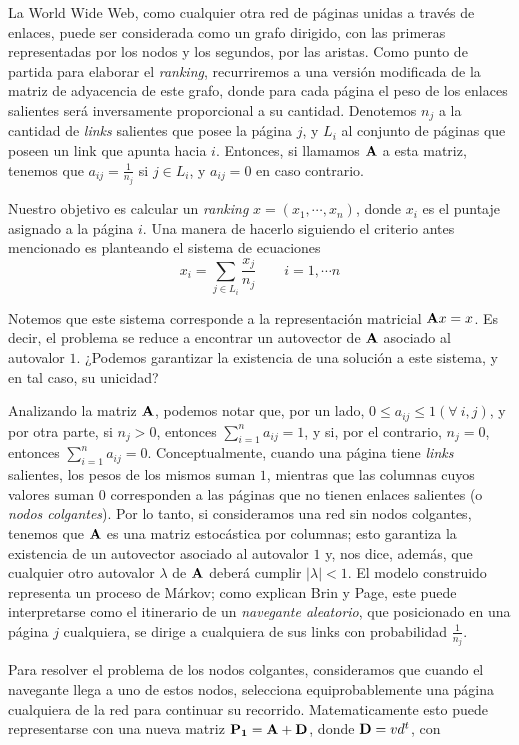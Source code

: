         La World Wide Web, como cualquier otra red de páginas unidas a través de enlaces, puede ser considerada como un grafo dirigido, con las primeras representadas por los nodos y los segundos, por las aristas. Como punto de partida para elaborar el \emph{ranking}, recurriremos a una versión modificada de la matriz de adyacencia de este grafo, donde para cada página el peso de los enlaces salientes será inversamente proporcional a su cantidad. Denotemos $n_{j}$ a la cantidad de \emph{links} salientes que posee la página $j$, y $L_i$ al conjunto de páginas que poseen un link que apunta hacia $i$. Entonces, si llamamos $\mathbf{A}$ a esta matriz, tenemos que $a_{ij} = \frac{1}{n_{j}}$ si $j \in L_i$, y $a_{ij} = 0$ en caso contrario.

        Nuestro objetivo es calcular un \emph{ranking} $x = (x_1, \cdots, x_n)$, donde $x_i$ es el puntaje asignado a la página $i$. Una manera de hacerlo siguiendo el criterio antes mencionado es planteando el sistema de ecuaciones
        \[ x_i = \sum_{j \in L_i} \frac{x_j}{n_j} \qquad i = 1, \cdots n \]

        Notemos que este sistema corresponde a la representación matricial $\mathbf{A}x = x$. Es decir, el problema se reduce a encontrar un autovector de $\mathbf{A}$ asociado al autovalor $1$. ¿Podemos garantizar la existencia de una solución a este sistema, y en tal caso, su unicidad?

        Analizando la matriz $\mathbf{A}$, podemos notar que, por un lado, $0 \leq a_{ij} \leq 1 (\forall\ i, j)$, y por otra parte, si $n_j > 0$, entonces $\sum_{i=1}^{n} a_{ij} = 1$, y si, por el contrario, $n_j = 0$, entonces $\sum_{i=1}^{n} a_{ij} = 0$. Conceptualmente, cuando una página tiene \emph{links} salientes, los pesos de los mismos suman $1$, mientras que las columnas cuyos valores suman $0$ corresponden a las páginas que no tienen enlaces salientes (o \emph{nodos colgantes}). Por lo tanto, si consideramos una red sin nodos colgantes, tenemos que $\mathbf{A}$ es una matriz estocástica por columnas; esto garantiza la existencia de un autovector asociado al autovalor $1$ y, nos dice, además, que cualquier otro autovalor $\lambda$ de $\mathbf{A}$ deberá cumplir $|\lambda| < 1$. El modelo construido representa un proceso de Márkov; como explican Brin y Page\cite{Brin1998}, este puede interpretarse como el itinerario de un \emph{navegante aleatorio}, que posicionado en una página $j$ cualquiera, se dirige a cualquiera de sus links con probabilidad $\frac{1}{n_j}$.

        Para resolver el problema de los nodos colgantes, consideramos que cuando el navegante llega a uno de estos nodos, selecciona equiprobablemente una página cualquiera de la red para continuar su recorrido. Matematicamente esto puede representarse con una nueva matriz $\mathbf{P_1} = \mathbf{A} + \mathbf{D}$, donde $\mathbf{D} = v d^t$, con

